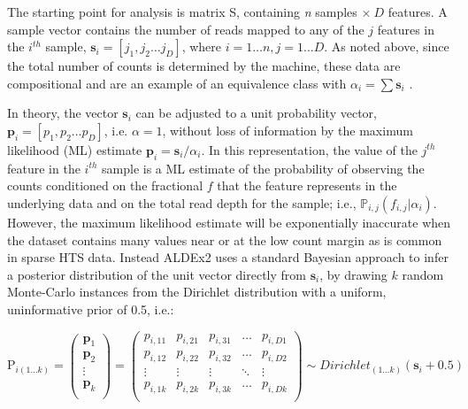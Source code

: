 \documentclass{bmcart}
\begin{document}
The starting point for analysis is matrix S, containing \textit{n} samples $ \times~D$ features. A  sample vector contains the number of reads mapped to any of the $j$  features in the $i^{th}$ sample,  $\textbf{s}_i=[j_1,j_2 \ldots j_D]$, where $i=1 \ldots n , j=1 \ldots D$. As noted above, since the total number of counts is determined by the machine, these data are compositional and are an example of an equivalence class with $\alpha_{i} = \sum \textbf{s}_{i}$ \cite{Gloor:2016cjm,gloor2016s}. 

In theory, the vector $\boldsymbol{s}_i$ can be adjusted to a unit probability vector,  ${\boldsymbol{p}_i=[p_1,p_2 \ldots p_D] }$, i.e. $\alpha=1$, without loss of information by the maximum likelihood (ML) estimate  $\boldsymbol{p}_i=\boldsymbol{s}_i / \alpha_{i}$. In this representation, the value of the $j^{th}$ feature in the $i^{th}$ sample is a ML estimate of the probability of observing the counts conditioned on the fractional  $f$ that the feature represents in the underlying data and on the total read depth for the sample; i.e., $\mathbb{P}_{i,j}(f_{i,j}|\alpha_{i})$. However, the maximum likelihood estimate will be exponentially inaccurate when the dataset contains many values near or at the low count margin \cite{Newey:1994} as is common in sparse HTS data. Instead ALDEx2 uses a standard Bayesian approach \cite{Jaynes:2003} to infer a posterior distribution of the unit vector directly from $\boldsymbol{s}_i$, by drawing $k$ random Monte-Carlo instances from the Dirichlet distribution with a uniform, uninformative prior of 0.5, i.e.:

\begin{equation}
\textrm{P}_{i (1 \ldots k)}=
\begin{pmatrix}
    \boldsymbol{p}_1 \\
    \boldsymbol{p}_2 \\
    \vdots \\
    \boldsymbol{p}_k \\
\end{pmatrix} =
\begin{pmatrix}
    p_{i,11} & p_{i,21} & p_{i,31} & \dots  &  p_{i,D1}  \\
    p_{i,12} & p_{i,22} & p_{i,32} & \dots  &  p_{i,D2}  \\
    \vdots & \vdots & \vdots & \ddots &  \vdots  \\
    p_{i,1k} & p_{i,2k} & p_{i,3k} & \dots  & p_{i,Dk} \\
\end{pmatrix}
\sim Dirichlet_{(1 \ldots k)}( \boldsymbol{s}_i + 0.5)
\label{eq:matrix}
\end{equation}
\end{document}
